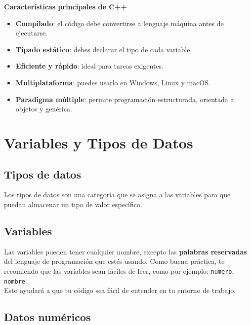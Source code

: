 \documentclass[
  11pt,
  a4paper,
  DIV=11,
  numbers=noendperiod]{scrreprt}
\begin{document}
\textbf{Características principales de C++}

\begin{itemize}
\item
  \textbf{Compilado}: el código debe convertirse a lenguaje máquina
  antes de ejecutarse.
\item
  \textbf{Tipado estático}: debes declarar el tipo de cada variable.
\item
  \textbf{Eficiente y rápido}: ideal para tareas exigentes.
\item
  \textbf{Multiplataforma}: puedes usarlo en Windows, Linux y macOS.
\item
  \textbf{Paradigma múltiple}: permite programación estructurada,
  orientada a objetos y genérica.
\end{itemize}


\chapter{Variables y Tipos de Datos}\label{variables-y-tipos-de-datos}

\section{Tipos de datos}\label{tipos-de-datos}

Los tipos de datos son una categoría que se asigna a las variables para
que puedan almacenar un tipo de valor específico.

\section{Variables}\label{variables}

Las variables pueden tener cualquier nombre, excepto las
\textbf{palabras reservadas} del lenguaje de programación que estés
usando. Como buena práctica, te recomiendo que las variables sean
fáciles de leer, como por ejemplo: \texttt{numero}, \texttt{nombre}.\\
Esto ayudará a que tu código sea fácil de entender en tu entorno de
trabajo.

\section{Datos numéricos}\label{datos-numuxe9ricos}
\end{document}
